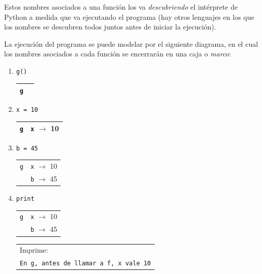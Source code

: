 Estos nombres asociados a una función los va \emph{descubriendo} el intérprete de
Python a medida que va ejecutando el programa (hay otros lenguajes en los
que los nombres se descubren todos juntos antes de iniciar la ejecución).

La ejecución del programa se puede modelar por el siguiente diagrama, en el
cual los nombres asociados a cada función se encerrarán en una caja o
\emph{marco}:

\newcommand{\currentframe}{\raisebox{1pt}{\tiny$\blacktriangleright$\normalsize} }

\begin{enumerate}

\item  \verb|g()   | \hspace{1.5cm}
	\begin{tabular}{r|r|}
	\hline
	\currentframe \verb|g|&\phantom{\verb|x| $\rightarrow$ 10} \\
	\hline
	\end{tabular}

\item  \verb|x = 10| \hspace{1.5cm}
	\begin{tabular}{r|r|}
	\hline
	\currentframe \verb|g|& \verb|x| $\rightarrow$ 10 \\
	\hline
	\end{tabular}

\item  \verb|b = 45| \hspace{1.5cm}
	\begin{tabular}{r|r|}
	\hline
	\currentframe \verb|g|& \verb|x| $\rightarrow$ 10 \\
	        & \verb|b| $\rightarrow$ 45 \\
	\hline
	\end{tabular}

\item  \verb|print | \hspace{1.5cm}
	\begin{tabular}{r|r|}
	\hline
	\currentframe \verb|g|& \verb|x| $\rightarrow$ 10 \\
	             & \verb|b| $\rightarrow$ 45 \\
	\hline
	\end{tabular}
	\hspace{1cm}
	\begin{tabular}{l}
	Imprime: \\
	{\small\tt En g, antes de llamar a f, x vale 10}
	\end{tabular}


\end{enumerate}
